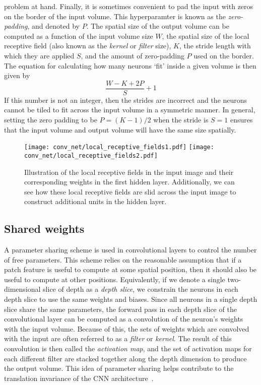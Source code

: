 \documentclass[../main.tex]{subfiles}
\begin{document}
problem at hand.
%
Finally, it is sometimes convenient to pad the input with zeros on the border
of the input volume.
%
This hyperparamter is known as the \emph{zero-padding}, and denoted by $P$.
%
The spatial size of the output volume can be computed as a function of the
input volume size $W$, the spatial size of the local receptive field (also
known as the \emph{kernel} or \emph{filter} size), $K$, the stride length with
which they are applied $S$, and the amount of zero-padding $P$ used on the
border.
%
The equation for calculating how many neurons `fit' inside a given volume is
then given by
%
\begin{equation}
  \frac{W - K + 2P}{S} + 1
\end{equation}
%
If this number is not an integer, then the strides are incorrect and the
neurons cannot be tiled to fit across the input volume in a symmetric manner.
%
In general, setting the zero padding to be $P = (K - 1) / 2$ when the stride is
$S=1$ ensures that the input volume and output volume will have the same size
spatially.
%
\begin{figure}[htpb]
  \centering
  \texttt{[image: conv\_net/local\_receptive\_fields1.pdf]}
  \hfill
  \texttt{[image: conv\_net/local\_receptive\_fields2.pdf]}
  \caption{Illustration of the local receptive fields in the input image and
    their corresponding weights in the first hidden layer. Additionally, we can
    see how these local receptive fields are slid across the input image to
    construct additional units in the hidden layer.}%
\label{fig:local_receptive_field}
\end{figure}
%
\subsection{Shared weights}
A parameter sharing scheme is used in convolutional layers to control the
number of free parameters.
%
This scheme relies on the reasonable assumption that if a patch feature is
useful to compute at some spatial position, then it should also be useful to
compute at other positions.
%
Equivalently, if we denote a single two-dimensional slice of depth as a
\emph{depth slice}, we constrain the neurons in each depth slice to use the
same weights and biases.
%
Since all neurons in a single depth slice share the same parameters, the
forward pass in each depth slice of the convolutional layer can be computed as
a convolution of the neuron's weights with the input volume.
%
Because of this, the sets of weights which are convolved with the input are
often referred to as a \emph{filter} or \emph{kernel}.
%
The result of this convolution is then called the \emph{activation map}, and
the set of activation maps for each different filter are stacked together along
the depth dimension to produce the output volume.
%
This idea of parameter sharing helps contribute to the translation invariance
of the CNN architecture~\cite{Zhang_1990}.
%
\end{document}
